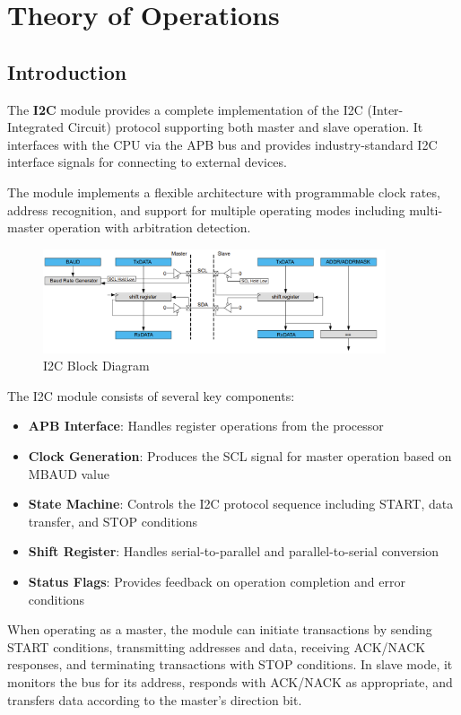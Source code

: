 \section{Theory of Operations}

\subsection{Introduction}
The \textbf{I2C} module provides a complete implementation of the I2C (Inter-Integrated Circuit) protocol supporting both master and slave operation. It interfaces with the CPU via the APB bus and provides industry-standard I2C interface signals for connecting to external devices.

The module implements a flexible architecture with programmable clock rates, address recognition, and support for multiple operating modes including multi-master operation with arbitration detection.

\begin{figure}[h]
  \includegraphics[width=0.90\textwidth]{images/i2c_block_diagram.png}
  \caption{I2C Block Diagram}\label{fig:block-diagram}
\end{figure}

The I2C module consists of several key components:
\begin{itemize}
    \item \textbf{APB Interface}: Handles register operations from the processor
    \item \textbf{Clock Generation}: Produces the SCL signal for master operation based on MBAUD value
    \item \textbf{State Machine}: Controls the I2C protocol sequence including START, data transfer, and STOP conditions
    \item \textbf{Shift Register}: Handles serial-to-parallel and parallel-to-serial conversion
    \item \textbf{Status Flags}: Provides feedback on operation completion and error conditions
\end{itemize}

When operating as a master, the module can initiate transactions by sending START conditions, transmitting addresses and data, receiving ACK/NACK responses, and terminating transactions with STOP conditions. In slave mode, it monitors the bus for its address, responds with ACK/NACK as appropriate, and transfers data according to the master's direction bit.

